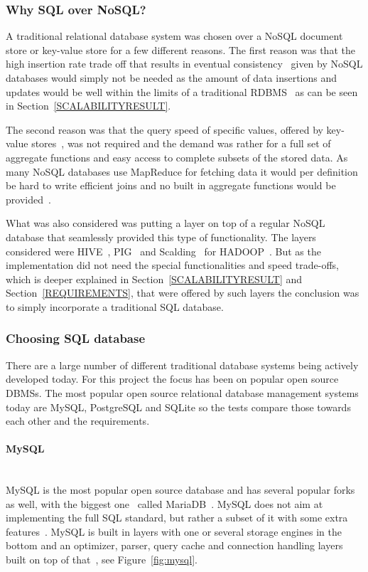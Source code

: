 \documentclass[a4paper,12pt]{article}
\begin{document}
\subsubsection{Why SQL over NoSQL?}
A traditional relational database system was chosen over a NoSQL document store or key-value store for a few different reasons.
The first reason was that the high insertion rate trade off that results in eventual consistency~\cite{EVENTUALCONS} given by NoSQL databases would simply not be needed as the amount of data insertions and updates would 
be well within the limits of a traditional RDBMS~\cite{SQLPERF} as can be seen in Section~\ref{SCALABILITYRESULT}.

The second reason was that the query speed of specific values, offered by key-value stores~\cite{KEYVALUESTORE}, was not required and the demand was rather for a full set of aggregate 
functions and easy access to complete subsets of the stored data. 
As many NoSQL databases use MapReduce for fetching data it would per definition be hard to write efficient joins and no built in aggregate functions would be provided~\cite{COMP}. 

What was also considered was putting a layer on top of a regular NoSQL database that seamlessly provided this type of functionality. 
The layers considered were HIVE~\cite{HIVE}, PIG~\cite{PIG} and Scalding~\cite{SCALDING} for HADOOP~\cite{HADOOP}. But as the implementation did not need the special functionalities and speed trade-offs, 
which is deeper explained in Section~\ref{SCALABILITYRESULT} and Section~\ref{REQUIREMENTS}, that were offered by such layers the conclusion was to simply incorporate a traditional SQL database. 

\subsubsection{Choosing SQL database}
\label{SQLDATABASES}
There are a large number of different traditional database systems being actively developed today. For this project the focus has been on popular open source DBMSs. 
The most popular open source relational database management systems~\cite{POPULARDBMS} today are MySQL, PostgreSQL and SQLite so the tests compare those towards each other and the requirements. 

\newpage
\paragraph{MySQL}
~\\
MySQL\cite{MYSQL} is the most popular open source database and has several popular forks as well, with the biggest one~\cite{POPULARDBMS} called MariaDB~\cite{MARIADB}. MySQL does not aim at implementing 
the full SQL standard, but rather a subset of it with some extra features~\cite{POPULARDBMS}. MySQL is built in layers with one or several storage engines in the bottom and an optimizer, parser, 
query cache and connection handling layers built on top of that~\cite{HIMYSQL}, see Figure~\ref{fig:mysql}.
\end{document}
